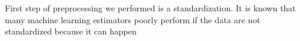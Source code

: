 First step of preprocessing we performed is a standardization. It is known that many machine learning estimators poorly perform if the data are not standardized because it can happen 